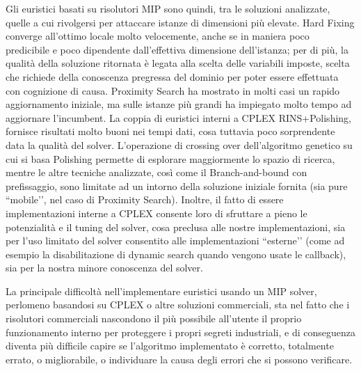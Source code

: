 Gli euristici basati su risolutori MIP sono quindi, tra le soluzioni analizzate, quelle a cui rivolgersi per attaccare istanze di dimensioni più elevate. Hard Fixing converge all’ottimo locale molto velocemente, anche se in maniera poco predicibile e poco dipendente dall’effettiva dimensione dell’istanza; per di più, la qualità della soluzione ritornata è legata alla scelta delle variabili imposte, scelta che richiede della conoscenza pregressa del dominio per poter essere effettuata con cognizione di causa. Proximity Search ha mostrato in molti casi un rapido aggiornamento iniziale, ma sulle istanze più grandi ha impiegato molto tempo ad aggiornare l'incumbent. La coppia di euristici interni a CPLEX RINS+Polishing, fornisce risultati molto buoni nei tempi dati, cosa tuttavia poco sorprendente data la qualità del solver. L’operazione di crossing over dell’algoritmo genetico su cui si basa Polishing permette di esplorare maggiormente lo spazio di ricerca, mentre le altre tecniche analizzate, così come il Branch-and-bound con prefissaggio, sono limitate ad un intorno della soluzione iniziale fornita (sia pure ``mobile’’, nel caso di Proximity Search). Inoltre, il fatto di essere implementazioni interne a CPLEX consente loro di sfruttare a pieno le potenzialità e il tuning del solver, cosa preclusa alle nostre implementazioni, sia per l’uso limitato del solver consentito alle implementazioni ``esterne’’ (come ad esempio la disabilitazione di dynamic search quando vengono usate le callback), sia per la nostra minore conoscenza del solver.

La principale difficoltà nell’implementare euristici usando un MIP solver, perlomeno basandosi su CPLEX o altre soluzioni commerciali, sta nel fatto che i risolutori commerciali nascondono il più possibile all’utente il proprio funzionamento interno per proteggere i propri segreti industriali, e di conseguenza diventa più difficile capire se l’algoritmo implementato è corretto, totalmente errato, o migliorabile, o individuare la causa degli errori che si possono verificare.

